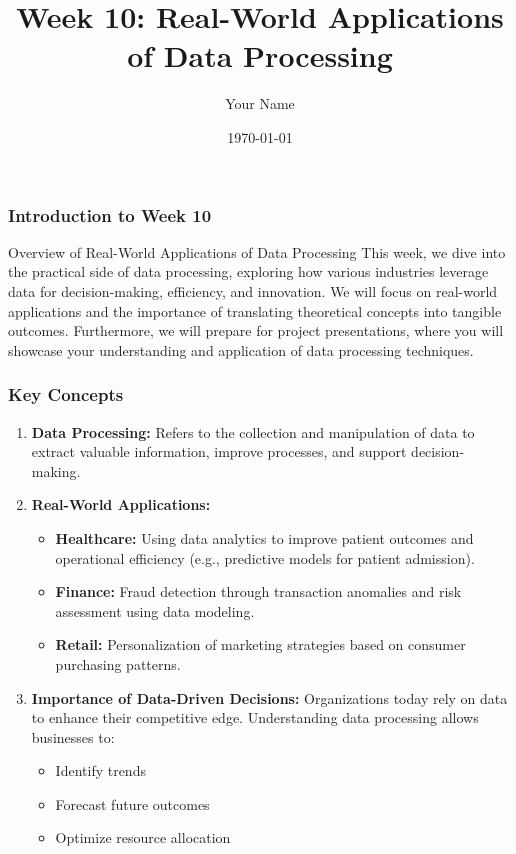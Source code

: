 \documentclass{beamer}
\title{Week 10: Real-World Applications of Data Processing}
\author{Your Name}
\institute{Your Institution}
\date{\today}
\begin{document}
\frame{\titlepage}

\begin{frame}[fragile]
    \frametitle{Introduction to Week 10}
    \begin{block}{Overview of Real-World Applications of Data Processing}
        This week, we dive into the practical side of data processing, exploring how various industries leverage data for decision-making, efficiency, and innovation. We will focus on real-world applications and the importance of translating theoretical concepts into tangible outcomes. Furthermore, we will prepare for project presentations, where you will showcase your understanding and application of data processing techniques.
    \end{block}
\end{frame}

\begin{frame}[fragile]
    \frametitle{Key Concepts}
    \begin{enumerate}
        \item \textbf{Data Processing:}
        Refers to the collection and manipulation of data to extract valuable information, improve processes, and support decision-making.
        
        \item \textbf{Real-World Applications:}
        \begin{itemize}
            \item \textbf{Healthcare:} Using data analytics to improve patient outcomes and operational efficiency (e.g., predictive models for patient admission).
            \item \textbf{Finance:} Fraud detection through transaction anomalies and risk assessment using data modeling.
            \item \textbf{Retail:} Personalization of marketing strategies based on consumer purchasing patterns.
        \end{itemize}
        
        \item \textbf{Importance of Data-Driven Decisions:}
        Organizations today rely on data to enhance their competitive edge. Understanding data processing allows businesses to:
        \begin{itemize}
            \item Identify trends
            \item Forecast future outcomes
            \item Optimize resource allocation
        \end{itemize}
    \end{enumerate}
\end{frame}
\end{document}

